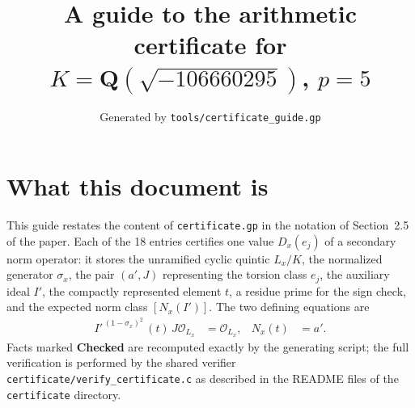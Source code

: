 \documentclass[11pt]{article}
\title{A guide to the arithmetic certificate for $K=\mathbf Q(\sqrt{-106660295})$, $p=5$}
\author{}
\date{Generated by \texttt{tools/certificate\_guide.gp}}
\begin{document}
\maketitle
\section*{What this document is}
This guide restates the content of \texttt{certificate.gp} in the
notation of Section~2.5 of the paper.  Each of the 18 entries
certifies one value $D_x(e_j)$ of a secondary norm operator: it
stores the unramified cyclic quintic $L_x/K$, the normalized
generator $\sigma_x$, the pair $(a',J)$ representing the torsion
class $e_j$, the auxiliary ideal $I'$, the compactly represented
element $t$, a residue prime for the sign check, and the expected
norm class $[N_x(I')]$.  The two defining equations are
\begin{align*}
I'^{\,(1-\sigma_x)^2}\,(t)\,J\mathcal O_{L_x}&=\mathcal O_{L_x},&
N_x(t)&=a'.
\end{align*}
Facts marked \textbf{Checked} are recomputed exactly by the
generating script; the full verification is performed by the
shared verifier \texttt{certificate/verify\_certificate.c} as
described in the README files of the \texttt{certificate}
directory.
\end{document}
